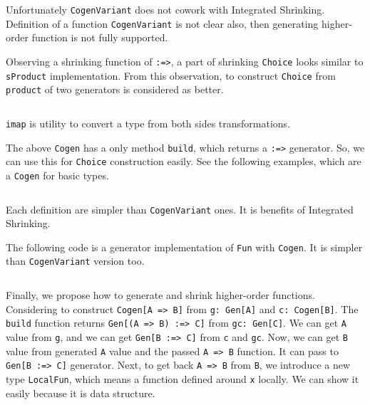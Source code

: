 \documentclass[a4paper,10pt]{article}
\theoremstyle{definition}
\begin{document}
\inputminted[breaklines,firstline=143,lastline=146]{scala}{../src/main/scala/minicheck.scala}

Unfortunately \texttt{CogenVariant} does not cowork with Integrated Shrinking.
Definition of a function \texttt{CogenVariant} is not clear also, then generating higher-order function is not fully supported.

Observing a shrinking function of \texttt{:=>}, a part of shrinking \texttt{Choice} looks similar to \texttt{sProduct} implementation.
From this observation, to construct \texttt{Choice} from \texttt{product} of two generators is considered as better.

\inputminted[breaklines,firstline=148,lastline=151]{scala}{../src/main/scala/minicheck.scala}

\texttt{imap} is utility to convert a type from both sides transformations.

The above \texttt{Cogen} has a only method \texttt{build}, which returns a \texttt{:=>} generator.
So, we can use this for \texttt{Choice} construction easily.
See the following examples, which are a \texttt{Cogen} for basic types.

\inputminted[breaklines,firstline=153,lastline=167]{scala}{../src/main/scala/minicheck.scala}

Each definition are simpler than \texttt{CogenVariant} ones.
It is benefits of Integrated Shrinking.

The following code is a generator implementation of \texttt{Fun} with \texttt{Cogen}.
It is simpler than \texttt{CogenVariant} version too.

\inputminted[breaklines,firstline=169,lastline=170]{scala}{../src/main/scala/minicheck.scala}

Finally, we propose how to generate and shrink higher-order functions.
Considering to construct \texttt{Cogen[A => B]} from \texttt{g: Gen[A]} and \texttt{c: Cogen[B]}.
The \texttt{build} function returns \texttt{Gen[(A => B) :=> C]} from \texttt{gc: Gen[C]}.
We can get \texttt{A} value from \texttt{g}, and we can get \texttt{Gen[B :=> C]} from \texttt{c} and \texttt{gc}.
Now, we can get \texttt{B} value from generated \texttt{A} value and the passed \texttt{A => B} function.
It can pass to \texttt{Gen[B :=> C]} generator.
Next, to get back \texttt{A => B} from \texttt{B}, we introduce a new type \texttt{LocalFun}, which means a function defined around \texttt{x} locally.
We can show it easily because it is data structure.

\inputminted[breaklines,firstline=172,lastline=178]{scala}{../src/main/scala/minicheck.scala}
\end{document}
